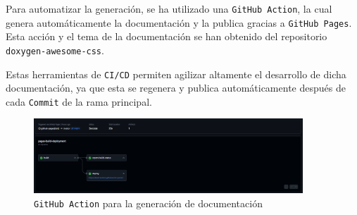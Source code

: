 Para automatizar la generación, se ha utilizado una \texttt{GitHub Action}, la cual genera automáticamente la documentación y la publica gracias a \texttt{GitHub Pages}. Esta acción y el tema de la documentación se han obtenido del repositorio \texttt{doxygen-awesome-css}. \cite{jotheproJotheproDoxygenawesomecss2024} 

Estas herramientas de \texttt{CI/CD} permiten agilizar altamente el desarrollo de dicha documentación, ya que esta se regenera y publica automáticamente después de cada \texttt{Commit} de la rama principal.

\begin{figure}[H]
    \centering
    \includegraphics[width=0.9\textwidth]{images/3-software/3-5-doxygen/githubAction.png}
    \caption{\texttt{GitHub Action} para la generación de documentación}
\end{figure}